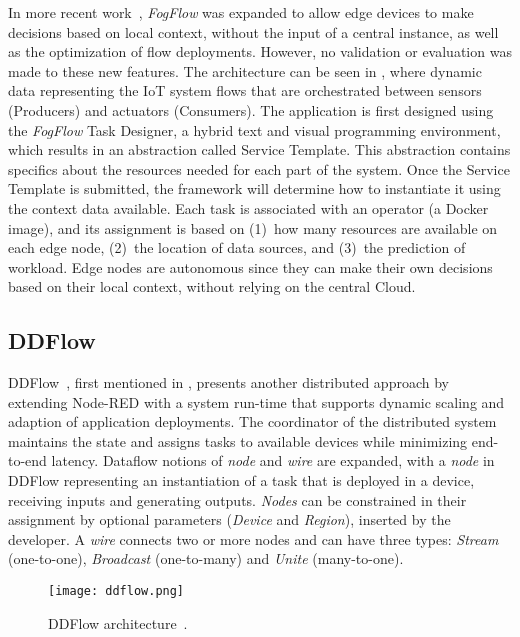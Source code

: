 In more recent work~\cite{fog_flow_tool}, \textit{FogFlow} was expanded to allow edge devices to make decisions based on local context, without the input of a central instance, as well as the optimization of flow deployments. However, no validation or evaluation was made to these new features. The architecture can be seen in , where dynamic data representing the IoT system flows that are orchestrated between sensors (Producers) and actuators (Consumers). The application is first designed using the \textit{FogFlow} Task Designer, a hybrid text and visual programming environment, which results in an abstraction called Service Template. This abstraction contains specifics about the resources needed for each part of the system. Once the Service Template is submitted, the framework will determine how to instantiate it using the context data available. Each task is associated with an operator (a Docker image), and its assignment is based on (1)~how many resources are available on each edge node, (2)~the location of data sources, and (3)~the prediction of workload. Edge nodes are autonomous since they can make their own decisions based on their local context, without relying on the central Cloud.

\subsection{DDFlow}\label{sec:decentralized_sota_ddflow}

DDFlow~\cite{ddflow}, first mentioned in , presents another distributed approach by extending Node-RED with a system run-time that supports dynamic scaling and adaption of application deployments. The coordinator of the distributed system maintains the state and assigns tasks to available devices while minimizing end-to-end latency. Dataflow notions of \textit{node} and \textit{wire} are expanded, with a \textit{node} in DDFlow representing an instantiation of a task that is deployed in a device, receiving inputs and generating outputs. \textit{Nodes} can be constrained in their assignment by optional parameters (\textit{Device} and \textit{Region}), inserted by the developer. A \textit{wire} connects two or more nodes and can have three types: \textit{Stream} (one-to-one), \textit{Broadcast} (one-to-many) and \textit{Unite} (many-to-one). 

\begin{figure}[h]
\centering
\texttt{[image: ddflow.png]}
\caption[DDFlow architecture]{DDFlow architecture~\cite{ddflow}.}\label{fig:ddflow}
\end{figure}

